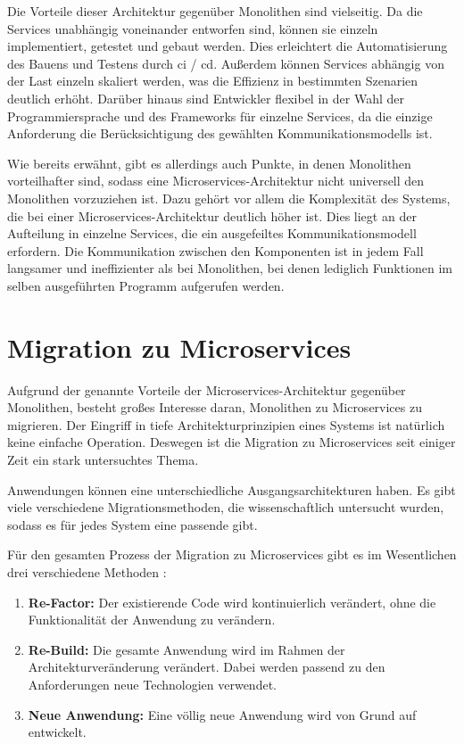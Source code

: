 Die Vorteile dieser Architektur gegenüber Monolithen sind vielseitig.
Da die Services unabhängig voneinander entworfen sind, können sie einzeln implementiert, getestet und gebaut werden.
Dies erleichtert die Automatisierung des Bauens und Testens durch \gls{ci} / \gls{cd}.
Außerdem können Services abhängig von der Last einzeln skaliert werden, was die Effizienz in bestimmten Szenarien deutlich erhöht.
Darüber hinaus sind Entwickler flexibel in der Wahl der Programmiersprache und des Frameworks für einzelne Services, da die einzige Anforderung die Berücksichtigung des gewählten Kommunikationsmodells ist.

Wie bereits erwähnt, gibt es allerdings auch Punkte, in denen Monolithen vorteilhafter sind, sodass eine Microservices-Architektur nicht universell den Monolithen vorzuziehen ist.
Dazu gehört vor allem die Komplexität des Systems, die bei einer Microservices-Architektur deutlich höher ist.
Dies liegt an der Aufteilung in einzelne Services, die ein ausgefeiltes Kommunikationsmodell erfordern.
Die Kommunikation zwischen den Komponenten ist in jedem Fall langsamer und ineffizienter als bei Monolithen, bei denen lediglich Funktionen im selben ausgeführten Programm aufgerufen werden.

\section{Migration zu Microservices}

Aufgrund der genannte Vorteile der Microservices-Architektur gegenüber Monolithen, besteht großes Interesse daran, Monolithen zu Microservices zu migrieren.
Der Eingriff in tiefe Architekturprinzipien eines Systems ist natürlich keine einfache Operation.
Deswegen ist die Migration zu Microservices seit einiger Zeit ein stark untersuchtes Thema.

Anwendungen können eine unterschiedliche Ausgangsarchitekturen haben.
Es gibt viele verschiedene Migrationsmethoden, die wissenschaftlich untersucht wurden, sodass es für jedes System eine passende gibt.

Für den gesamten Prozess der Migration zu Microservices gibt es im Wesentlichen drei verschiedene Methoden \cite{master-daniel-koch}:
\begin{enumerate}
	\item \textbf{Re-Factor:} Der existierende Code wird kontinuierlich verändert, ohne die Funktionalität der Anwendung zu verändern.
	\item \textbf{Re-Build:} Die gesamte Anwendung wird im Rahmen der Architekturveränderung verändert. Dabei werden passend zu den Anforderungen neue Technologien verwendet.
	\item \textbf{Neue Anwendung:} Eine völlig neue Anwendung wird von Grund auf entwickelt.
\end{enumerate}

